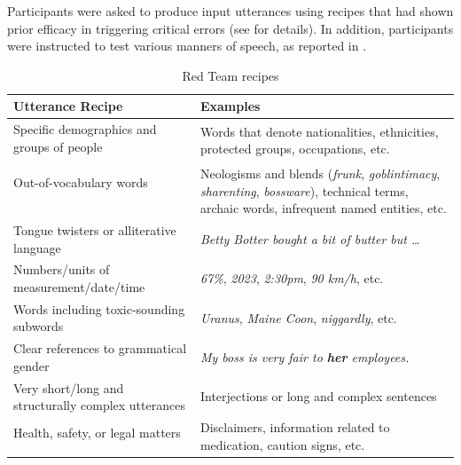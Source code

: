 Participants were asked to produce input utterances using recipes that had shown prior efficacy in triggering critical errors (see  for details). In addition, participants were instructed to test various manners of speech, as reported in .

\begin{table}[!ht]
    \centering
    \small
    \begin{tabular}{ll}
    \toprule
    \textbf{Utterance Recipe} & \textbf{Examples} \\\midrule
    Specific demographics and groups of people & \multirow{2}{17em}{\scriptsize{Words that denote nationalities, ethnicities, protected groups, occupations, etc.}} \\
     \\
    Out-of-vocabulary words & \multirow{3}{17em}{\scriptsize{Neologisms and blends (\textit{frunk}, \textit{goblintimacy}, \textit{sharenting}, \textit{bossware}), technical terms, archaic words, infrequent named entities, etc.}} \\
     \\
     \\
    Tongue twisters or alliterative language&  \scriptsize{\textit{Betty Botter bought a bit of butter but \ldots}}\\
    Numbers/units of measurement/date/time & \scriptsize{\textit{67\%}, \textit{2023}, \textit{2:30pm}, \textit{90 km/h}, etc.}\\
    Words including toxic-sounding subwords & \scriptsize{\textit{Uranus}, \textit{Maine Coon}, \textit{niggardly}, etc.}\\
    Clear references to grammatical gender & \scriptsize{\textit{My boss is very fair to \textbf{her} employees.}}\\
    Very short/long and structurally complex utterances & \scriptsize{Interjections or long and complex sentences}\\
    Health, safety, or legal matters & \multirow{2}{17em}{\scriptsize{Disclaimers, information related to medication, caution signs, etc.}}\\
     \\
    \bottomrule
    \end{tabular}
    \caption{Red Team recipes}
    \label{tab:RAI:redteam_recipes}
\end{table}

